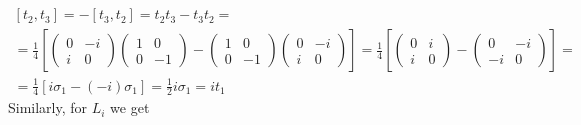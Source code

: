 \documentclass{article}
\begin{document}
\begin{equation}
\begin{gathered}
    \\
    \left[t_2,t_3\right] = - \left[t_3,t_2\right] = t_2t_3 - t_3t_2 = \\ = \frac{1}{4}\left[\begin{pmatrix}0&-i\\i&0\end{pmatrix}\begin{pmatrix}1&0\\0&-1\end{pmatrix} - \begin{pmatrix}1&0\\0&-1\end{pmatrix}\begin{pmatrix}0&-i\\i&0\end{pmatrix}\right] = \frac{1}{4}\left[\begin{pmatrix}0&i\\i&0\end{pmatrix} - \begin{pmatrix}0&-i\\-i&0\end{pmatrix}\right] = \\ = \frac{1}{4}\left[i\sigma_1 - \left(-i\right)\sigma_1\right] = \frac{1}{2}i\sigma_1 = it_1
\end{gathered}
\end{equation}
Similarly, for $L_i$ we get
\end{document}
